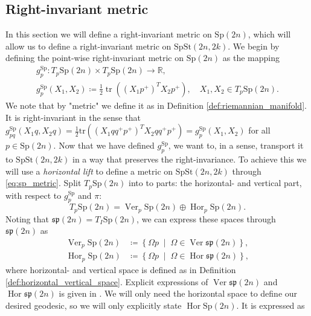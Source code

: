 \subsection{Right-invariant metric}
In this section we will define a right-invariant metric on $\mathrm{Sp}(2n)$, which will allow us to define a right-invariant metric on $\mathrm{SpSt}(2n, 2k)$. We begin by defining the point-wise right-invariant metric on $\mathrm{Sp}(2n)$ as the mapping 
\begin{equation}\label{eq:sp_metric}
    \begin{gathered}
        g_{p}^{\mathrm{Sp}}\colon T_{p}\mathrm{Sp}(2n)\times T_{p}\mathrm{Sp}(2n)\xrightarrow{}\mathbb{R},\\
        g_{p}^{\mathrm{Sp}}(X_{1},X_{2})\coloneqq\frac{1}{2}\operatorname{tr}((X_{1}p^{+})^{T}X_{2}p^{+}),\quad X_{1},X_{2}\in T_{p}\mathrm{Sp}(2n).
    \end{gathered}
\end{equation}
We note that by "metric" we define it as in Definition \ref{def:riemannian_manifold}. It is right-invariant in the sense that
$g_{pq}^{\mathrm{Sp}}(X_{1}q,X_{2}q)=\tfrac{1}{2}\mathrm{tr}((X_{1}qq^{+}p^{+})^{T}X_{2}qq^{+}p^{+})=g_{p}^{\mathrm{Sp}}(X_{1},X_{2})$ for all $p\in \mathrm{Sp}(2n)$.
Now that we have defined $g_{p}^{\mathrm{Sp}}$, we want to, in a sense, transport it to $\mathrm{SpSt}(2n, 2k)$ in a way that preserves the right-invariance. To achieve this we will use a \textit{horizontal lift} to define a metric on $\mathrm{SpSt}(2n, 2k)$ through \ref{eq:sp_metric}. Split $T_{p}\mathrm{Sp}(2n)$ into to parts: the horizontal- and vertical part, with respect to $g^\mathrm{Sp}_{p}$ and $\pi$: 
\begin{equation}\label{eq:spst_split}
    T_{p}\mathrm{Sp}(2n)=\operatorname{Ver}_{p}\mathrm{Sp}(2n)\oplus \operatorname{Hor}_{p}\mathrm{Sp}(2n).
\end{equation}
%
Noting that $\mathfrak{sp}(2n)=T_{I}\mathrm{Sp}(2n)$, we can express these spaces through $\mathfrak{sp}(2n)$ as
%
\begin{align*}
\operatorname{Ver}_{p}\mathrm{Sp}(2n)&\coloneqq\left\{ \Omega p\;\middle|\;\Omega \in \operatorname{Ver}\mathfrak{sp}(2n) \right\}, \\
\operatorname{Hor}_{p}\mathrm{Sp}(2n)&\coloneqq\left\{ \Omega p\;\middle|\;\Omega \in \operatorname{Hor}\mathfrak{sp}(2n) \right\},
\end{align*}
%
where horizontal- and vertical space is defined as in Definition \ref{def:horizontal_vertical_space}. Explicit expressions of $\operatorname{Ver}\mathfrak{sp}(2n)$ and $\operatorname{Hor}\mathfrak{sp}(2n)$ is given in \cite[p.~11]{BendokatZimmermann2021}. We will only need the horizontal space to define our desired geodesic, so we will only explicitly state $\operatorname{Hor}\mathrm{Sp}(2n)$. It is expressed as

